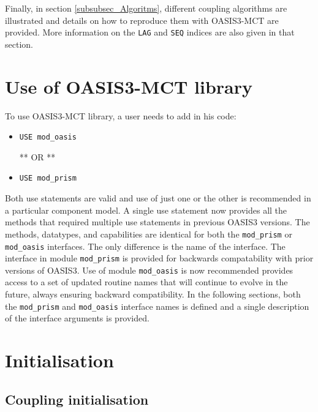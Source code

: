 Finally, in section \ref{subsubsec_Algoritms}, different coupling
algorithms are illustrated and details on how to
reproduce them with OASIS3-MCT are provided. More information on the {\tt LAG} and {\tt SEQ} indices are also given in that section.

\section{Use of OASIS3-MCT library}
\label{subsubsec_Use}

To use OASIS3-MCT library, a user needs to add in his code: 

\begin{itemize}

\item {\tt USE mod\_oasis}

 ** OR **

\item {\tt USE mod\_prism}
 
\end{itemize}

Both use statements are valid and use of just one or the other is recommended in a particular component model. A single use statement now provides all the methods that required multiple use statements in previous OASIS3 versions.  The 
methods, datatypes, and capabilities are identical for both the {\tt mod\_prism} or {\tt mod\_oasis} interfaces.  The only difference is the name of the interface. The interface in module {\tt mod\_prism} is provided for backwards compatability with prior versions of OASIS3. Use of module {\tt mod\_oasis} is now recommended provides access to a set of updated routine names that will continue to evolve in the future, always ensuring backward compatibility.  In the following sections, both the {\tt mod\_prism} and {\tt mod\_oasis} interface names is defined and a single description of the interface arguments is provided. 

\section{Initialisation}
\label{subsubsec_Initialisation}

\subsection{Coupling initialisation}

